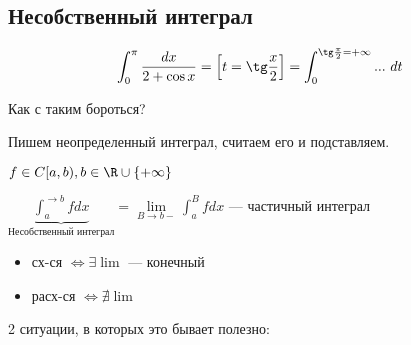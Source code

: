 \newpage

\subsection{Несобственный интеграл}
\begin{motivation}
    \[
        \int_0^\pi \frac{dx}{2 + \cos x} = \left[ t = \tg \frac{x}{2} \right] = \int_0^{\tg \frac{\pi}{2} = +\infty} ... \,\, dt 
    \]

    Как с таким бороться?

    Пишем неопределенный интеграл, считаем его и подставляем.
\end{motivation}

\begin{definition}
    $f \in C[a, b),  b \in \R \cup \{ + \infty \}$

    $\underbrace{\int_a^{\to b} f dx}_{\text{Несобственный интеграл}} = \lim\limits_{B \to b-} \int_a^B f dx$ --- частичный интеграл
\\
\begin{itemize}
    \item сх-ся $\Longleftrightarrow \exists \lim$ --- конечный
    \item расх-ся $\Longleftrightarrow \nexists \lim$
\end{itemize}
    
\end{definition}


2 ситуации, в которых это бывает полезно: \\\\\\


